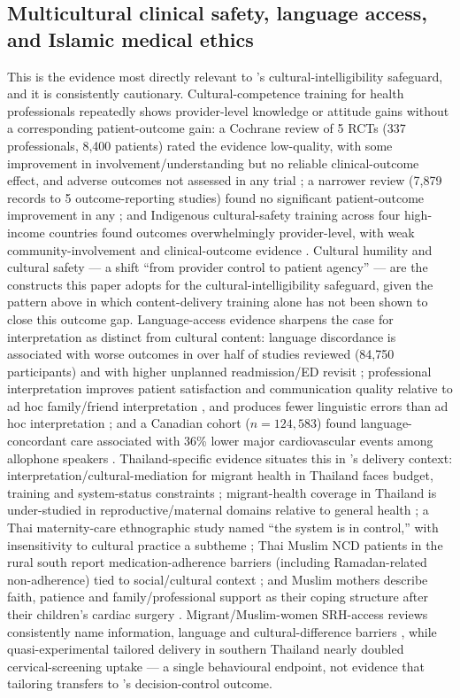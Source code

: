 \subsection{Multicultural clinical safety, language access, and Islamic medical ethics}
This is the evidence most directly relevant to \tphe{}'s cultural-intelligibility safeguard, and it is consistently cautionary. Cultural-competence training for health professionals repeatedly shows provider-level knowledge or attitude gains without a corresponding patient-outcome gain: a Cochrane review of 5 RCTs (337 professionals, 8{,}400 patients) rated the evidence low-quality, with some improvement in involvement/understanding but no reliable clinical-outcome effect, and adverse outcomes not assessed in any trial \cite{ref55}; a narrower review (7{,}879 records to 5 outcome-reporting studies) found no significant patient-outcome improvement in any \cite{ref56}; and Indigenous cultural-safety training across four high-income countries found outcomes overwhelmingly provider-level, with weak community-involvement and clinical-outcome evidence \cite{ref57}. Cultural humility \cite{ref58} and cultural safety --- a shift ``from provider control to patient agency'' \cite{ref59} --- are the constructs this paper adopts for the cultural-intelligibility safeguard, given the pattern above in which content-delivery training alone has not been shown to close this outcome gap. Language-access evidence sharpens the case for interpretation as distinct from cultural content: language discordance is associated with worse outcomes in over half of studies reviewed (84{,}750 participants) \cite{ref60} and with higher unplanned readmission/ED revisit \cite{ref61}; professional interpretation improves patient satisfaction and communication quality relative to ad hoc family/friend interpretation \cite{ref62}, and produces fewer linguistic errors than ad hoc interpretation \cite{ref63}; and a Canadian cohort ($n=124{,}583$) found language-concordant care associated with 36\% lower major cardiovascular events among allophone speakers \cite{ref64}. Thailand-specific evidence situates this in \tphe{}'s delivery context: interpretation/cultural-mediation for migrant health in Thailand faces budget, training and system-status constraints \cite{ref65}; migrant-health coverage in Thailand is under-studied in reproductive/maternal domains relative to general health \cite{ref66}; a Thai maternity-care ethnographic study named ``the system is in control,'' with insensitivity to cultural practice a subtheme \cite{ref67}; Thai Muslim NCD patients in the rural south report medication-adherence barriers (including Ramadan-related non-adherence) tied to social/cultural context \cite{ref68}; and Muslim mothers describe faith, patience and family/professional support as their coping structure after their children's cardiac surgery \cite{ref69}. Migrant/Muslim-women SRH-access reviews consistently name information, language and cultural-difference barriers \cite{ref70,ref20}, while quasi-experimental tailored delivery in southern Thailand nearly doubled cervical-screening uptake \cite{ref71} --- a single behavioural endpoint, not evidence that tailoring transfers to \tphe{}'s decision-control outcome.

